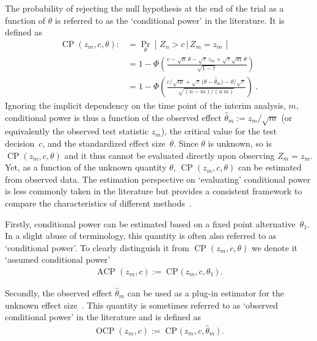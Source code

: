 \documentclass[12pt]{article}
\renewcommand{\Pr}{\operatorname{Pr}}
\newcommand{\CP}{\ensuremath{\operatorname{CP}}}
\newcommand{\ACP}{\ensuremath{\operatorname{ACP}}}
\newcommand{\OCP}{\ensuremath{\operatorname{OCP}}}
\renewcommand{\Pr}{\ensuremath{\operatorname{Pr}}}
\newcommand{\cond}{\ensuremath{\,|\,}}
\begin{document}
The probability of rejecting the null hypothesis at the end of the trial
as a function of $\theta$ is referred to as the `conditional power' in the literature.
It is defined as
\begin{align}
    \CP(z_m, c, \theta) :&= \Pr_\theta[\,Z_n > c \cond Z_m = z_m\,] \\
        &= 1 - \Phi\left(
            \frac{c - \sqrt{n}\,\theta - \sqrt{\tau} \, z_m + \sqrt{\tau}\sqrt{m}\,\theta
            }{\sqrt{1 - \tau}}
        \right) \\
        &= 1 - \Phi\left(
            \frac{c/\sqrt{m} + \sqrt{\tau}\,\big(\theta - \widehat{\theta}_m\big) - \theta/\sqrt{\tau}
            }{\sqrt{(n - m)/(n\,m)}}
        \right)      \ .
\end{align}
Ignoring the implicit dependency on the time point of the interim analysis, $m$,
conditional power is thus a function of the observed effect $\widehat{\theta}_m:=z_m/\sqrt{m}$
(or equivalently the observed test statistic $z_m$), the critical value for the test decision~$c$,
and the standardized effect size~$\theta$.
Since $\theta$ is unknown,
so is $\CP(z_m, c, \theta)$ and it thus cannot be
evaluated directly upon observing $Z_m=z_m$.
Yet, as a function of the unknown quantity $\theta$,
$\CP(z_m, c, \theta)$ can be estimated from observed data.
The estimation perspective on `evaluating' conditional power is
less commonly taken in the literature but provides a consistent framework to
compare the characteristics of different methods~\cite{bauer2006}.

Firstly, conditional power can be estimated based on a fixed point alternative~$\theta_1$.
In a slight abuse of terminology,
this quantity is often also referred to as `conditional power'.
To clearly distinguish it from $\CP(z_m, c, \theta)$ we denote
it `assumed conditional power'
\begin{align}
    \ACP(z_m,c) := \CP\big(\, z_m, c, \theta_1 \,\big) \ .
\end{align}

Secondly, the observed effect $\widehat{\theta}_m$ can be used
as a plug-in estimator for the unknown effect size~\cite{proschan1995}.
This quantity is sometimes referred to as `observed conditional power'
in the literature and is defined as
\begin{align}
    \OCP(z_m, c) := \CP\big(\, z_m, c, \widehat{\theta}_m \,\big) \ .
\end{align}
\end{document}
